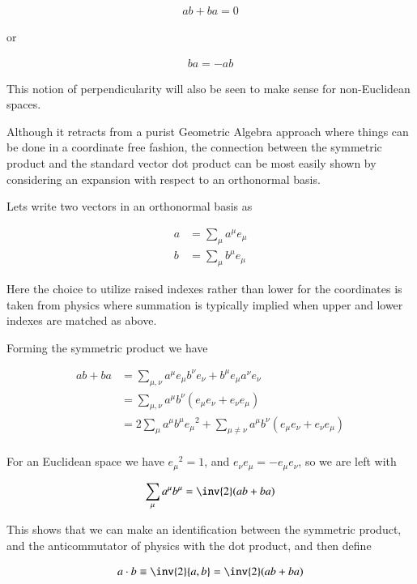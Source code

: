 \begin{align*}
a b + ba = 0
\end{align*}

or

\begin{align*}
b a = - a b
\end{align*}

This notion of perpendicularity will also be seen to make sense for non-Euclidean spaces.

Although it retracts from a purist Geometric Algebra approach where things can be done in a coordinate free fashion, the connection between the symmetric product and the standard vector dot product can be most easily shown by considering an expansion with respect to an orthonormal basis.

Lets write two vectors in an orthonormal basis as

\begin{align*}
a &= \sum_\mu a^\mu e_\mu \\
b &= \sum_\mu b^\mu e_\mu
\end{align*}

Here the choice to utilize raised indexes rather than lower for the coordinates is taken from physics where summation is typically implied when upper and lower indexes are matched as above.

Forming the symmetric product we have

\begin{align*}
a b + b a
&=
\sum_{\mu,\nu} a^\mu e_\mu b^\nu e_\nu + b^\mu e_\mu a^\nu e_\nu \\
&=
\sum_{\mu,\nu} a^\mu b^\nu \left( e_\mu e_\nu + e_\nu e_\mu \right) \\
&=
2 \sum_{\mu} a^\mu b^\mu {e_\mu}^2 + \sum_{\mu \ne \nu} a^\mu b^\nu \left( e_\mu e_\nu + e_\nu e_\mu \right) \\
\end{align*}

For an Euclidean space we have ${e_\mu}^2 = 1$, and $e_\nu e_\mu = -e_\mu e_\nu$, so we are left with

\begin{align*}
\sum_{\mu} a^\mu b^\mu = \inv{2} ( a b + b a)
\end{align*}

This shows that we can make an identification between the symmetric product, and the anticommutator of physics with the dot product, and then define

\begin{align}\label{eqn:dotDefined}
a \cdot b \equiv \inv{2} \symmetric{a}{b} = \inv{2} (a b + ba)
\end{align}

